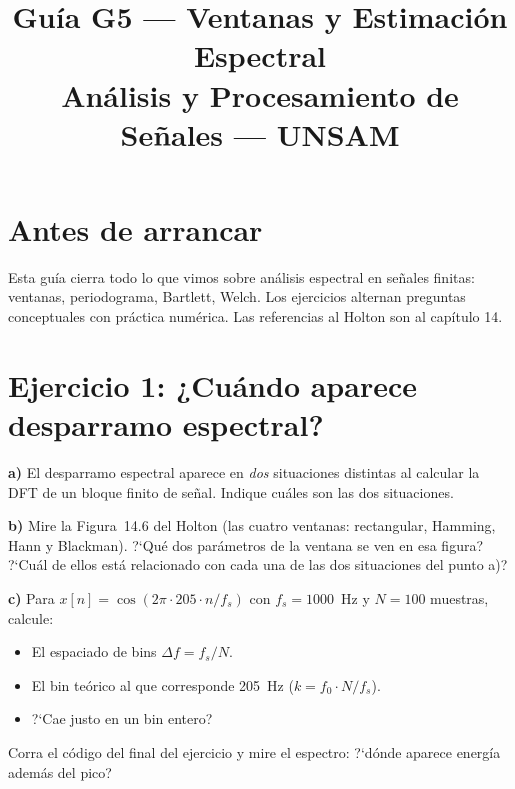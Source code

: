 \documentclass[11pt, a4paper]{article}
\title{\textbf{Gu\'ia G5 --- Ventanas y Estimaci\'on Espectral}\\[0.2cm]
       \large An\'alisis y Procesamiento de Se\~nales --- UNSAM}
\date{}
\begin{document}
\maketitle

\section*{Antes de arrancar}

Esta gu\'ia cierra todo lo que vimos sobre an\'alisis espectral en se\~nales finitas:
ventanas, periodograma, Bartlett, Welch.
Los ejercicios alternan preguntas conceptuales con pr\'actica num\'erica.
Las referencias al Holton son al cap\'itulo 14.

\section*{Ejercicio 1: ¿Cu\'ando aparece desparramo espectral?}

\begin{enun}
\textbf{a)} El desparramo espectral aparece en \emph{dos} situaciones distintas
al calcular la DFT de un bloque finito de se\~nal.
Indique cu\'ales son las dos situaciones.

\textbf{b)} Mire la Figura~14.6 del Holton (las cuatro ventanas: rectangular,
Hamming, Hann y Blackman).
?`Qu\'e dos par\'ametros de la ventana se ven en esa figura?
?`Cu\'al de ellos est\'a relacionado con cada una de las dos situaciones del punto a)?

\textbf{c)} Para $x[n] = \cos(2\pi \cdot 205 \cdot n/f_s)$ con $f_s = 1000$~Hz
y $N = 100$ muestras, calcule:
\begin{itemize}[noitemsep]
  \item El espaciado de bins $\Delta f = f_s / N$.
  \item El bin te\'orico al que corresponde 205~Hz ($k = f_0 \cdot N / f_s$).
  \item ?`Cae justo en un bin entero?
\end{itemize}
Corra el c\'odigo del final del ejercicio y mire el espectro: ?`d\'onde aparece
energ\'ia adem\'as del pico?
\end{enun}
\end{document}

